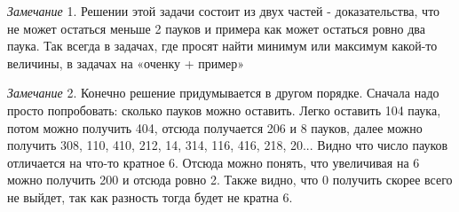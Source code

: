 \textit{Замечание} 1. Решении этой задачи состоит из двух частей - доказательства, что не может остаться меньше 2 пауков и примера как может остаться ровно два паука. Так всегда в задачах, где просят найти минимум или максимум какой-то величины, в задачах на «оченку + пример»

\textit{Замечание} 2. Конечно решение придумывается в другом порядке. Сначала надо просто попробовать: сколько пауков можно оставить. Легко оставить 104 паука, потом можно получить 404, отсюда получается 206 и 8 пауков, далее можно получить 308, 110, 410, 212, 14, 314, 116, 416, 218, 20... Видно что число пауков отличается на что-то кратное 6. Отсюда можно понять, что увеличивая на 6 можно получить 200 и отсюда ровно 2. Также видно, что 0 получить скорее всего не выйдет, так как разность тогда будет не кратна 6.